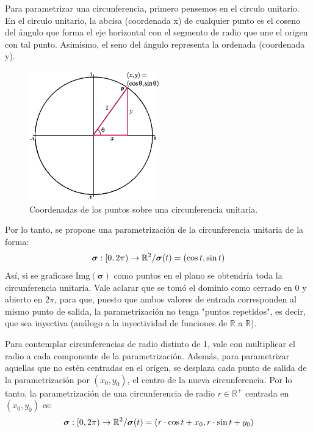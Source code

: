 \begin{definition}
    \begin{example}
        Para parametrizar una circunferencia, primero pensemos en el circulo unitario.
        En el circulo unitario, la abcisa (coordenada x) de cualquier punto es el coseno del ángulo que forma el eje horizontal con el segmento de radio
        que une el origen con tal punto. Asimismo, el seno del ángulo representa la ordenada (coordenada y).
        \begin{figure}[H] 
            \centering
            \includegraphics[width=0.5\textwidth]{../figs/unitCircle1.png} %
            \caption{Coordenadas de los puntos sobre una circunferencia unitaria.}
            \label{fig:unitCircle1} %
        \end{figure}
        Por lo tanto, se propone una parametrización de la circunferencia unitaria de la forma:
        \begin{equation*}
            \boldsymbol{\sigma}:[0,2\pi)\rightarrow\mathbb{R}^2/ \\ \boldsymbol{\sigma}(t)=(\cos{t},\sin{t})
        \end{equation*}
        Así, si se graficase $\text{Img}(\boldsymbol{\sigma})$ como puntos en el plano se obtendría toda la circunferencia unitaria.
        Vale aclarar que se tomó el dominio como cerrado en $0$ y abierto en $2\pi$, para que, puesto que ambos valores de 
        entrada corresponden al mismo punto de salida, la parametrización no tenga "puntos repetidos", es decir, que sea inyectiva 
        (análogo a la inyectividad de funciones de $\mathbb{R}$ a $\mathbb{R}$).

        Para contemplar circunferencias de radio distinto de 1, vale con multiplicar el radio a cada componente de la parametrización.
        Además, para parametrizar aquellas que no estén centradas en el orígen, se desplaza cada punto de salida de la
        parametrización por $(x_0,y_0)$, el centro de la nueva circunferencia.
        Por lo tanto, la parametrización de una circunferencia de radio $r\in\mathbb{R}^+$ centrada en $(x_0,y_0)$ es:
        \begin{equation*}
            \boldsymbol{\sigma}:[0,2\pi)\rightarrow\mathbb{R}^2/ \\ \boldsymbol{\sigma}(t)=(r\cdot\cos{t}+x_0,r\cdot\sin{t}+y_0)
        \end{equation*} 
    \end{example}
\end{definition}